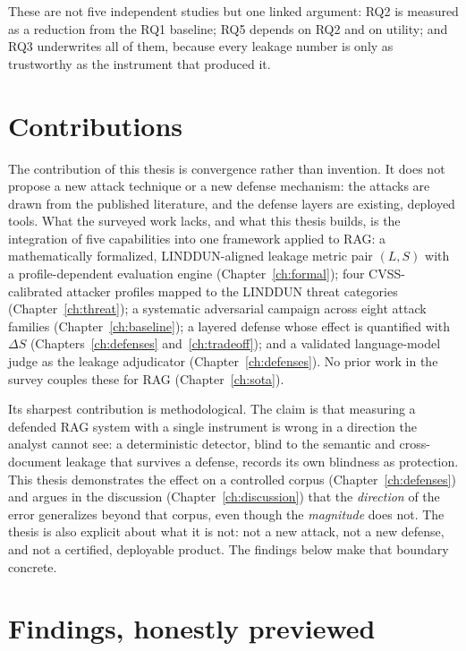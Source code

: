 \documentclass[12pt,a4paper]{report}
\begin{document}
These are not five independent studies but one linked argument: RQ2 is measured as a reduction
from the RQ1 baseline; RQ5 depends on RQ2 and on utility; and RQ3 underwrites all of them,
because every leakage number is only as trustworthy as the instrument that produced it.

\section{Contributions}
\label{sec:intro-contrib}

The contribution of this thesis is convergence rather than invention. It does not propose a new
attack technique or a new defense mechanism: the attacks are drawn from the published literature,
and the defense layers are existing, deployed tools. What the surveyed work lacks, and what this
thesis builds, is the integration of five capabilities into one framework applied to RAG: a
mathematically formalized, LINDDUN-aligned leakage metric pair $(L,S)$ with a profile-dependent
evaluation engine (Chapter~\ref{ch:formal}); four CVSS-calibrated attacker profiles mapped to the
LINDDUN threat categories (Chapter~\ref{ch:threat}); a systematic adversarial campaign across eight attack
families (Chapter~\ref{ch:baseline}); a layered defense whose effect is quantified with $\Delta S$
(Chapters~\ref{ch:defenses} and~\ref{ch:tradeoff}); and a validated language-model judge as the
leakage adjudicator (Chapter~\ref{ch:defenses}). No prior work in the survey couples these for RAG
(Chapter~\ref{ch:sota}).

Its sharpest contribution is methodological. The claim is that measuring a defended RAG system with
a single instrument is wrong in a direction the analyst cannot see: a deterministic detector, blind
to the semantic and cross-document leakage that survives a defense, records its own blindness as
protection. This thesis demonstrates the effect on a controlled corpus (Chapter~\ref{ch:defenses})
and argues in the discussion (Chapter~\ref{ch:discussion}) that the \emph{direction} of the error
generalizes beyond that corpus, even though the \emph{magnitude} does not. The thesis is also
explicit about what it is not: not a new attack, not a new defense, and not a certified, deployable
product. The findings below make that boundary concrete.

\section{Findings, honestly previewed}
\label{sec:intro-findings}
\end{document}
